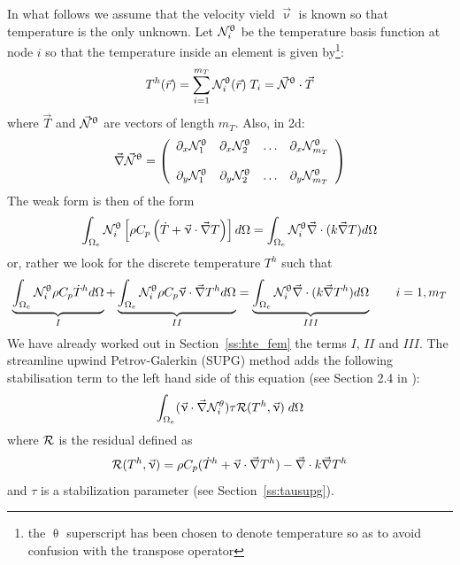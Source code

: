 In what follows we assume that the velocity vield $\vec \upnu$ is known so that temperature is the
only unknown.
Let ${\mathcal{N}}^\uptheta_i$ be the temperature basis function at node $i$ so that the temperature inside an element is
given by\footnote{the $\uptheta$ superscript has been chosen to denote temperature so as to avoid confusion
with the transpose operator}:
\begin{equation}
T^h({\vec r}) = \sum_{i=1}^{m_T} {\mathcal{N}}^\uptheta_i ({\vec r})\;  T_i = \vec {{\mathcal{N}}}^\uptheta \cdot \vec T
\end{equation}
where $\vec T$ and $\vec {{\mathcal{N}}}^\uptheta$ are vectors of length $m_T$. Also, in 2d:
\[
\vec \nabla \vec {{\mathcal{N}}}^\uptheta = 
\left(
\begin{array}{cccc}
\partial_x {\mathcal{N}}_1^\uptheta & 
\partial_x {\mathcal{N}}_2^\uptheta & \dots &
\partial_x {\mathcal{N}}_{m_T}^\uptheta \\ \\
\partial_y {\mathcal{N}}_1^\uptheta & 
\partial_y {\mathcal{N}}_2^\uptheta & \dots &
\partial_y {\mathcal{N}}_{m_T}^\uptheta 
\end{array}
\right)
\]
The weak form is then of the form
\begin{equation}
\int_{\Omega_e} {\mathcal{N}}^\uptheta_i \left[ 
\rho C_p \left( \dot{T} + {\vec \upnu}\cdot {\vec\nabla T} \right) \right] d\Omega
= \int_{\Omega_e}  {\mathcal{N}}^\uptheta_i {\vec \nabla} \cdot (k \vec\nabla T ) d\Omega
\end{equation}
or, rather we look for the discrete temperature $T^h$ such that
\[
\underbrace{\int_{\Omega_e} {\mathcal{N}}^\uptheta_i  \rho C_p \dot{T}^h d\Omega}_{I}
+ \underbrace{\int_{\Omega_e} {\mathcal{N}}^\uptheta_i  \rho C_p  {\vec \upnu}\cdot {\vec\nabla T^h}   d\Omega}_{II}
= \underbrace{\int_{\Omega_e}  {\mathcal{N}}^\uptheta_i {\vec \nabla} \cdot (k \vec\nabla T^h )d\Omega}_{III}
\quad\quad
i=1,m_T
\]
We have already worked out in Section~\ref{ss:hte_fem} the terms $I$, $II$ and $III$.
The streamline upwind Petrov-Galerkin (SUPG) 
method adds the following stabilisation term to the left hand side of this equation (see Section 2.4 
in \textcite{dohu03}):
\begin{equation}
\int_{\Omega_e} (\vec\upnu\cdot\vec\nabla {\mathcal{N}}_i^\theta ) \tau {\cal R}(T^h,\vec\upnu) \; d\Omega
\label{eq:supg:res1}
\end{equation}
where ${\cal R}$ is the residual defined as
\begin{equation}
{\cal R}(T^h,\vec\upnu) = 
\rho C_p (\dot{T}^h +  {\vec \upnu}\cdot {\vec\nabla T^h}) - {\vec \nabla} \cdot k \vec\nabla T^h 
\label{eq:supg:res2}
\end{equation}
and $\tau$ is a stabilization parameter (see Section~\ref{ss:tausupg}).

